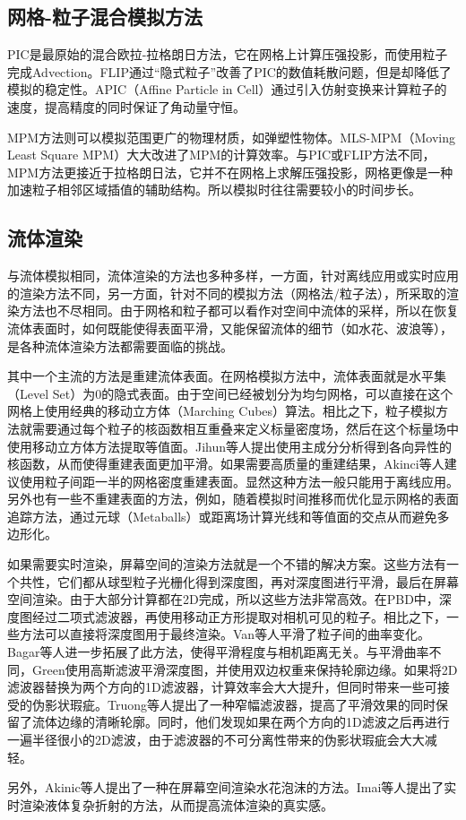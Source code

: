\subsection{网格-粒子混合模拟方法}

    PIC是最原始的混合欧拉-拉格朗日方法，它在网格上计算压强投影，而使用粒子完成Advection。FLIP\cite{ZB05FLIP}通过“隐式粒子”改善了PIC的数值耗散问题，但是却降低了模拟的稳定性。APIC（Affine Particle in Cell）\cite{JSS15APIC, JST17APIC}通过引入仿射变换来计算粒子的速度，提高精度的同时保证了角动量守恒。
    
    MPM\cite{JST16MPM}方法则可以模拟范围更广的物理材质，如弹塑性物体。MLS-MPM（Moving Least Square MPM）\cite{HFG18MSLMPM, HLA19Taichi}大大改进了MPM的计算效率。与PIC或FLIP方法不同，MPM方法更接近于拉格朗日法，它并不在网格上求解压强投影，网格更像是一种加速粒子相邻区域插值的辅助结构。所以模拟时往往需要较小的时间步长。

\subsection{流体渲染}

    与流体模拟相同，流体渲染的方法也多种多样，一方面，针对离线应用或实时应用的渲染方法不同，另一方面，针对不同的模拟方法（网格法/粒子法），所采取的渲染方法也不尽相同。由于网格和粒子都可以看作对空间中流体的采样，所以在恢复流体表面时，如何既能使得表面平滑，又能保留流体的细节（如水花、波浪等），是各种流体渲染方法都需要面临的挑战。
    
    其中一个主流的方法是重建流体表面。在网格模拟方法中，流体表面就是水平集（Level Set）\cite{OS88LS}为0的隐式表面。由于空间已经被划分为均匀网格，可以直接在这个网格上使用经典的移动立方体\cite{LC87MC}（Marching Cubes）算法。相比之下，粒子模拟方法就需要通过每个粒子的核函数相互重叠来定义标量密度场，然后在这个标量场中使用移动立方体方法提取等值面。Jihun\cite{YT13AK}等人提出使用主成分分析得到各向异性的核函数，从而使得重建表面更加平滑。如果需要高质量的重建结果，Akinci等人建议使用粒子间距一半的网格密度重建表面\cite{AIA12SR, AAI12SR}。显然这种方法一般只能用于离线应用。另外也有一些不重建表面的方法，例如，随着模拟时间推移而优化显示网格的表面追踪方法\cite{EFF02LS}，通过元球\cite{KSN08MB, ZSP08ASR}（Metaballs）或距离场\cite{GSS10SPH}计算光线和等值面的交点从而避免多边形化。
    
    如果需要实时渲染，屏幕空间的渲染方法就是一个不错的解决方案。这些方法有一个共性，它们都从球型粒子光栅化得到深度图，再对深度图进行平滑，最后在屏幕空间渲染。由于大部分计算都在2D完成，所以这些方法非常高效。在PBD中，深度图经过二项式滤波器，再使用移动正方形提取对相机可见的粒子\cite{MHH07PBD}。相比之下，一些方法\cite{VGS09SSF, G10SSF, BSW10LPF, TY18NRSSF}可以直接将深度图用于最终渲染。Van\cite{VGS09SSF}等人平滑了粒子间的曲率变化。Bagar\cite{BSW10LPF}等人进一步拓展了此方法，使得平滑程度与相机距离无关。与平滑曲率不同，Green\cite{G10SSF}使用高斯滤波平滑深度图，并使用双边权重来保持轮廓边缘。如果将2D滤波器替换为两个方向的1D滤波器，计算效率会大大提升，但同时带来一些可接受的伪影状瑕疵。Truong\cite{TY18NRSSF}等人提出了一种窄幅滤波器，提高了平滑效果的同时保留了流体边缘的清晰轮廓。同时，他们发现如果在两个方向的1D滤波之后再进行一遍半径很小的2D滤波，由于滤波器的不可分离性带来的伪影状瑕疵会大大减轻。
    
    另外，Akinic\cite{ADA13SSF}等人提出了一种在屏幕空间渲染水花泡沫的方法。Imai\cite{IKM16SSF}等人提出了实时渲染液体复杂折射的方法，从而提高流体渲染的真实感。